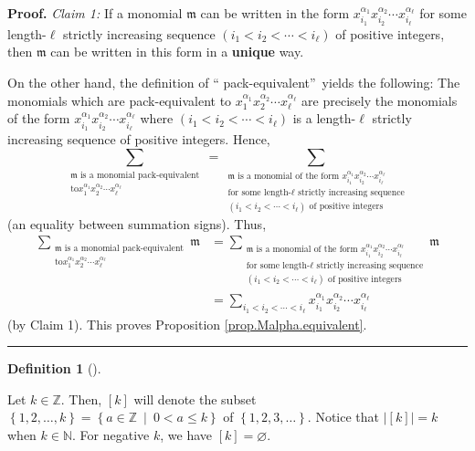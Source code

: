 \documentclass[numbers=enddot,12pt,final,onecolumn,notitlepage,abstracton]{scrartcl}
\theoremstyle{definition}
\newtheorem{defi}[theo]{Definition}
\newenvironment{definition}[1][]
{\begin{defi}[#1]\begin{leftbar}}
{\end{leftbar}\end{defi}}
\newenvironment{proof}[1][Proof]{\noindent\textbf{#1.} }{\ \rule{0.5em}{0.5em}}
\let\sumnonlimits\sum
\renewcommand{\sum}{\sumnonlimits\limits}
\newenvironment{verlong}{}{}
\begin{document}
\begin{verlong}
\begin{footnotesize}
\begin{proof}
\textit{Claim 1:} If a monomial $\mathfrak{m}$ can be written in the form
$x_{i_{1}}^{\alpha_{1}}x_{i_{2}}^{\alpha_{2}}\cdots x_{i_{\ell}}^{\alpha
_{\ell}}$ for some length-$\ell$ strictly increasing sequence $\left(
i_{1}<i_{2}<\cdots<i_{\ell}\right)  $ of positive integers, then
$\mathfrak{m}$ can be written in this form in a \textbf{unique} way.

On the other hand, the definition of \textquotedblleft
pack-equivalent\textquotedblright\ yields the following: The monomials which
are pack-equivalent to $x_{1}^{\alpha_{1}}x_{2}^{\alpha_{2}}\cdots x_{\ell
}^{\alpha_{\ell}}$ are precisely the monomials of the form $x_{i_{1}}%
^{\alpha_{1}}x_{i_{2}}^{\alpha_{2}}\cdots x_{i_{\ell}}^{\alpha_{\ell}}$ where
$\left(  i_{1}<i_{2}<\cdots<i_{\ell}\right)  $ is a length-$\ell$ strictly
increasing sequence of positive integers. Hence,%
\[
\sum_{\substack{\mathfrak{m}\text{ is a monomial pack-equivalent}\\\text{to
}x_{1}^{\alpha_{1}}x_{2}^{\alpha_{2}}\cdots x_{\ell}^{\alpha_{\ell}}}%
}=\sum_{\substack{\mathfrak{m}\text{ is a monomial of the form }x_{i_{1}%
}^{\alpha_{1}}x_{i_{2}}^{\alpha_{2}}\cdots x_{i_{\ell}}^{\alpha_{\ell}%
}\\\text{for some length-}\ell\text{ strictly increasing sequence}\\\left(
i_{1}<i_{2}<\cdots<i_{\ell}\right)  \text{ of positive integers}}}
\]
(an equality between summation signs). Thus,%
\begin{align*}
\sum_{\substack{\mathfrak{m}\text{ is a monomial pack-equivalent}\\\text{to
}x_{1}^{\alpha_{1}}x_{2}^{\alpha_{2}}\cdots x_{\ell}^{\alpha_{\ell}}%
}}\mathfrak{m}  &  =\sum_{\substack{\mathfrak{m}\text{ is a monomial of the
form }x_{i_{1}}^{\alpha_{1}}x_{i_{2}}^{\alpha_{2}}\cdots x_{i_{\ell}}%
^{\alpha_{\ell}}\\\text{for some length-}\ell\text{ strictly increasing
sequence}\\\left(  i_{1}<i_{2}<\cdots<i_{\ell}\right)  \text{ of positive
integers}}}\mathfrak{m}\\
&  =\sum_{i_{1}<i_{2}<\cdots<i_{\ell}}x_{i_{1}}^{\alpha_{1}}x_{i_{2}}%
^{\alpha_{2}}\cdots x_{i_{\ell}}^{\alpha_{\ell}}%
\end{align*}
(by Claim 1). This proves Proposition \ref{prop.Malpha.equivalent}.
\end{proof}

\begin{definition}
\label{def.k}Let $k\in\mathbb{Z}$. Then, $\left[  k\right]  $ will denote the
subset $\left\{  1,2,\ldots,k\right\}  =\left\{  a\in\mathbb{Z}\ \mid\ 0<a\leq
k\right\}  $ of $\left\{  1,2,3,\ldots\right\}  $. Notice that $\left\vert
\left[  k\right]  \right\vert =k$ when $k\in\mathbb{N}$. For negative $k$, we
have $\left[  k\right]  =\varnothing$.
\end{definition}


\end{footnotesize}
\end{verlong}
\end{document}
